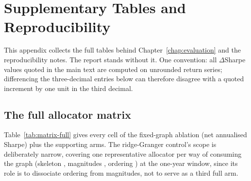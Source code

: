 \chapter{Supplementary Tables and Reproducibility}
\label{app:tables}

This appendix collects the full tables behind Chapter~\ref{chap:evaluation}
and the reproducibility notes. The report stands without it. One convention:
all $\Delta$Sharpe values quoted in the main text are computed on unrounded
return series; differencing the three-decimal entries below can therefore
disagree with a quoted increment by one unit in the third decimal.

\section{The full allocator matrix}

Table~\ref{tab:matrix-full} gives every cell of the fixed-graph ablation
(net annualised Sharpe) plus the supporting arms. The ridge-Granger control's
scope is deliberately narrow, covering one representative allocator per way
of
consuming the graph (skeleton \skelsamp{}, magnitudes \skelsem{}, ordering
\orientsamp{}) at the
one-year window, since its role is to dissociate ordering from
magnitudes, not to serve as a third full arm.

